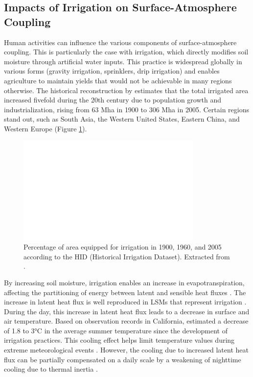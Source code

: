 \subsection{Impacts of Irrigation on Surface-Atmosphere Coupling}

Human activities can influence the various components of surface-atmosphere coupling. This is particularly the case with irrigation, which directly modifies soil moisture through artificial water inputs. This practice is widespread globally in various forms (gravity irrigation, sprinklers, drip irrigation) and enables agriculture to maintain yields that would not be achievable in many regions otherwise. The historical reconstruction by \citet{siebert_global_2015} estimates that the total irrigated area increased fivefold during the 20th century due to population growth and industrialization, rising from 63 Mha in 1900 to 306 Mha in 2005. Certain regions stand out, such as South Asia, the Western United States, Eastern China, and Western Europe (Figure \ref{irrig_evolution_map}).

\begin{figure}[ht]
    \centering
    \includegraphics[width=\textwidth]{images/irrig_evolution_Siebert.png}
    \caption{Percentage of area equipped for irrigation in 1900, 1960, and 2005 according to the HID (Historical Irrigation Dataset). Extracted from \citet{siebert_global_2015}.}
    \label{irrig_evolution_map}
\end{figure}

By increasing soil moisture, irrigation enables an increase in evapotranspiration, affecting the partitioning of energy between latent and sensible heat fluxes \citep{pokhrel_incorporating_2012}. The increase in latent heat flux is well reproduced in LSMs that represent irrigation \citep{pokhrel_incorporating_2012, arboleda-obando_validation_2024, al-yaari_role_2022}. During the day, this increase in latent heat flux leads to a decrease in surface and air temperature. Based on observation records in California, \citet{bonfils_empirical_2007} estimated a decrease of 1.8 to 3°C in the average summer temperature since the development of irrigation practices. This cooling effect helps limit temperature values during extreme meteorological events \citep{thiery_present-day_2017, thiery_warming_2020}. However, the cooling due to increased latent heat flux can be partially compensated on a daily scale by a weakening of nighttime cooling due to thermal inertia \citep{chen_irrigation_2018}.

